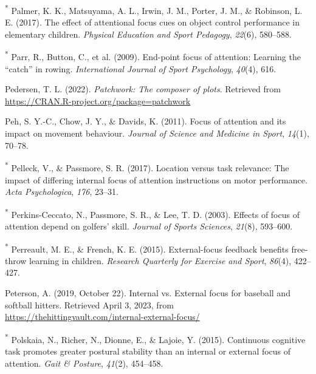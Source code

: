 \documentclass[
  man, donotrepeattitle,floatsintext]{apa7}
\newlength{\cslhangindent}
\newlength{\cslentryspacingunit} %
\newenvironment{CSLReferences}[2] %
 {%
  \setlength{\parindent}{0pt}
  \ifodd #1
  \let\oldpar\par
  \def\par{\hangindent=\cslhangindent\oldpar}
  \fi
  \setlength{\parskip}{#2\cslentryspacingunit}
 }%
 {}
\begin{document}
\begin{CSLReferences}{1}{0}
\leavevmode{}%
\textsuperscript{*} Palmer, K. K., Matsuyama, A. L., Irwin, J. M., Porter, J. M., \& Robinson, L. E. (2017). The effect of attentional focus cues on object control performance in elementary children. \emph{Physical Education and Sport Pedagogy}, \emph{22}(6), 580--588.

\leavevmode{}%
\textsuperscript{*} Parr, R., Button, C., et al. (2009). End-point focus of attention: Learning the {``catch''} in rowing. \emph{International Journal of Sport Psychology}, \emph{40}(4), 616.

\leavevmode{}%
Pedersen, T. L. (2022). \emph{Patchwork: The composer of plots}. Retrieved from \url{https://CRAN.R-project.org/package=patchwork}

\leavevmode{}%
Peh, S. Y.-C., Chow, J. Y., \& Davids, K. (2011). Focus of attention and its impact on movement behaviour. \emph{Journal of Science and Medicine in Sport}, \emph{14}(1), 70--78.

\leavevmode{}%
\textsuperscript{*} Pelleck, V., \& Passmore, S. R. (2017). Location versus task relevance: The impact of differing internal focus of attention instructions on motor performance. \emph{Acta Psychologica}, \emph{176}, 23--31.

\leavevmode{}%
\textsuperscript{*} Perkins-Ceccato, N., Passmore, S. R., \& Lee, T. D. (2003). Effects of focus of attention depend on golfers' skill. \emph{Journal of Sports Sciences}, \emph{21}(8), 593--600.

\leavevmode{}%
\textsuperscript{*} Perreault, M. E., \& French, K. E. (2015). External-focus feedback benefits free-throw learning in children. \emph{Research Quarterly for Exercise and Sport}, \emph{86}(4), 422--427.

\leavevmode{}%
Peterson, A. (2019, October 22). Internal vs. External focus for baseball and softball hitters. Retrieved April 3, 2023, from \url{https://thehittingvault.com/internal-external-focus/}

\leavevmode{}%
\textsuperscript{*} Polskaia, N., Richer, N., Dionne, E., \& Lajoie, Y. (2015). Continuous cognitive task promotes greater postural stability than an internal or external focus of attention. \emph{Gait \& Posture}, \emph{41}(2), 454--458.


\end{CSLReferences}
\end{document}

